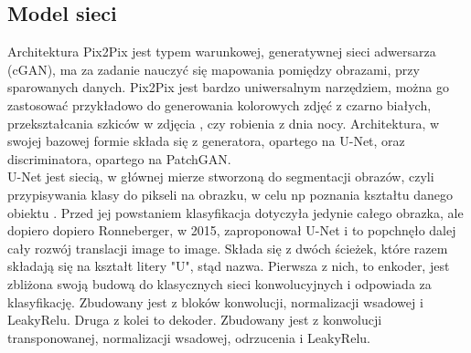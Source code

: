\documentclass[12pt]{article}
\begin{document}
\begin{sloppypar}
{  \subsection{Model sieci} \label{model}
  {
    Architektura Pix2Pix jest typem warunkowej, generatywnej sieci adwersarza (cGAN), ma za zadanie nauczyć się mapowania pomiędzy obrazami, przy sparowanych danych.
    Pix2Pix jest bardzo uniwersalnym narzędziem, można go zastosować przykładowo do generowania kolorowych zdjęć z czarno białych, przekształcania szkiców w zdjęcia \cite{pix2pix-tf}, czy robienia z dnia nocy. 
    Architektura, w swojej bazowej formie składa się z generatora, opartego na U-Net, oraz discriminatora, opartego na PatchGAN. \\
    U-Net jest siecią, w głównej mierze stworzoną do segmentacji obrazów, czyli przypisywania klasy do pikseli na obrazku, w celu np poznania kształtu danego obiektu \cite{image-seg}.
    Przed jej powstaniem klasyfikacja dotyczyła jedynie całego obrazka, ale dopiero dopiero Ronneberger, w 2015, zaproponował U-Net i to popchnęło dalej cały rozwój translacji image to image. 
    Składa się z dwóch ścieżek, które razem składają się na kształt litery "U", stąd nazwa. Pierwsza z nich, to enkoder, jest zbliżona swoją budową do klasycznych sieci konwolucyjnych i odpowiada za klasyfikację. 
    Zbudowany jest z bloków konwolucji, normalizacji wsadowej i LeakyRelu. 
    Druga z kolei to dekoder\cite{u-net}. Zbudowany jest z konwolucji transponowanej, normalizacji wsadowej, odrzucenia i LeakyRelu.
    \begin{figure}[H]
      \centering

\end{figure}}}
\end{sloppypar}
\end{document}
